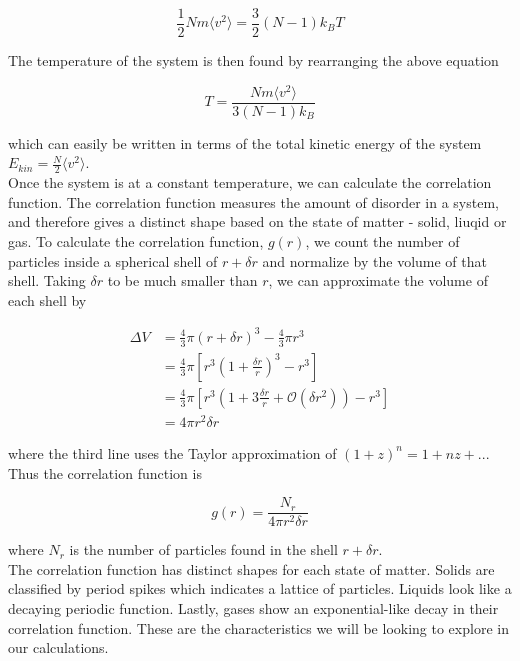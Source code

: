 \documentclass{article}
\begin{document}
\begin{multicols}{2}
\begin{equation}
\frac{1}{2}N m \langle v^2 \rangle = \frac{3}{2} (N-1) k_B T
\end{equation}

\noindent The temperature of the system is then found by rearranging the above equation

\begin{equation}
T = \frac{Nm \langle v^2 \rangle}{3(N-1)k_B}
\end{equation}

\noindent which can easily be written in terms of the total kinetic energy of the system $E_{kin} = \frac{N}{2} \langle v^2 \rangle $.  \\

Once the system is at a constant temperature, we can calculate the correlation function.  The correlation function measures the amount of disorder in a system, and therefore gives a distinct shape based on the state of matter - solid, liuqid or gas.  To calculate the correlation function, $g(r)$, we count the number of particles inside a spherical shell of $r + \delta r$ and normalize by the volume of that shell.  Taking $\delta r$ to be much smaller than $r$, we can approximate the volume of each shell by

\begin{equation}
\begin{split}
\Delta V & = \frac{4}{3} \pi (r+\delta r)^3 - \frac{4}{3} \pi r^3 \\
& = \frac{4}{3} \pi \left [ r^3 \left (1+\frac{\delta r}{r} \right )^3 - r^3 \right ] \\
& = \frac{4}{3} \pi \left [ r^3 \left ( 1 + 3\frac{\delta r}{r} + \mathcal{O} (\delta r ^2) \right ) - r^3 \right ] \\
& = 4 \pi r^2 \delta r
\end{split}
\end{equation}

\noindent where the third line uses the Taylor approximation of $(1+z)^n = 1 + nz+ ...$  Thus the correlation function is

\begin{equation}
g(r) = \frac{N_r}{4 \pi r^2 \delta r}
\end{equation}

\noindent where $N_r$ is the number of particles found in the shell $r + \delta r$.  \\

The correlation function has distinct shapes for each state of matter.  Solids are classified by period spikes which indicates a lattice of particles.  Liquids look like a decaying periodic function.  Lastly, gases show an exponential-like decay in their correlation function.  These are the characteristics we will be looking to explore in our calculations. \\


\end{multicols}
\end{document}
